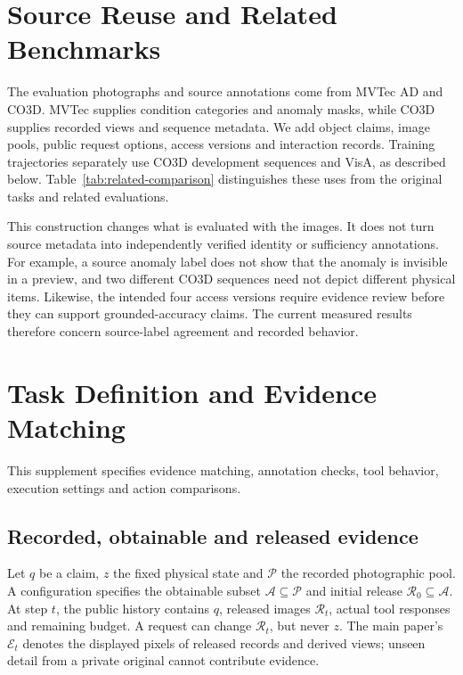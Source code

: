 \section{Source Reuse and Related Benchmarks}
The evaluation photographs and source annotations come from MVTec AD and CO3D.
MVTec supplies condition categories and anomaly masks, while CO3D supplies recorded views and sequence metadata.
We add object claims, image pools, public request options, access versions and interaction records.
Training trajectories separately use CO3D development sequences and VisA, as described below.
Table~\ref{tab:related-comparison} distinguishes these uses from the original tasks and related evaluations.

This construction changes what is evaluated with the images.
It does not turn source metadata into independently verified identity or sufficiency annotations.
For example, a source anomaly label does not show that the anomaly is invisible in a preview, and two different CO3D sequences need not depict different physical items.
Likewise, the intended four access versions require evidence review before they can support grounded-accuracy claims.
The current measured results therefore concern source-label agreement and recorded behavior.



\section{Task Definition and Evidence Matching}
This supplement specifies evidence matching, annotation checks, tool behavior, execution settings and action comparisons.

\subsection{Recorded, obtainable and released evidence}
Let \(q\) be a claim, \(z\) the fixed physical state and \(\mathcal{P}\) the recorded photographic pool.
A configuration specifies the obtainable subset \(\mathcal{A}\subseteq\mathcal{P}\) and initial release \(\mathcal{R}_0\subseteq\mathcal{A}\).
At step \(t\), the public history contains \(q\), released images \(\mathcal{R}_t\), actual tool responses and remaining budget.
A request can change \(\mathcal{R}_t\), but never \(z\). The main paper's \(\mathcal{E}_t\) denotes the displayed pixels of released records and derived views; unseen detail from a private original cannot contribute evidence.

